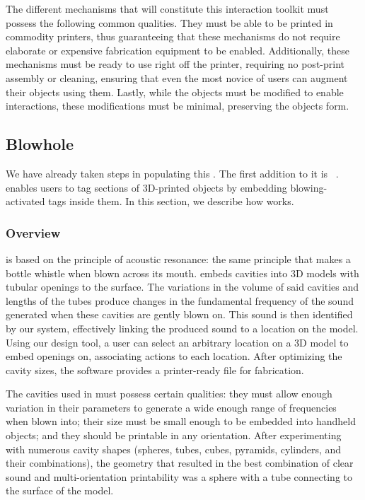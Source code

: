     The different mechanisms that will constitute this interaction toolkit must
    possess the following common qualities. They must be able to be printed in
    commodity printers, thus guaranteeing that these mechanisms do not require
    elaborate or expensive fabrication equipment to be enabled. Additionally,
    these mechanisms must be ready to use right off the printer, requiring no
    post-print assembly or cleaning, ensuring that even the most novice of
    users can augment their objects using them. Lastly, while the objects must
    be modified to enable interactions, these modifications must be minimal,
    preserving the objects form.

    \subsection{Blowhole}
      We have already taken steps in populating this \itoolkit. The first
      addition to it is \bh~\cite{Tejada:2018fj}. \bh enables users to tag
      sections of 3D-printed objects by embedding blowing-activated tags inside
      them. In this section, we describe how \bh works.

      \subsubsection{Overview}
        \bh is based on the principle of acoustic resonance: the same principle
        that makes a bottle whistle when blown across its mouth.  \bh embeds
        cavities into 3D models with tubular openings to the surface. The
        variations in the volume of said cavities and lengths of the tubes
        produce changes in the fundamental frequency of the sound generated
        when these cavities are gently blown on. This sound is then identified
        by our system, effectively linking the produced sound to a location on
        the model. Using our design tool, a user can select an arbitrary
        location on a 3D model to embed openings on, associating actions to
        each location. After optimizing the cavity sizes, the software provides
        a printer-ready file for fabrication.

        The cavities used in \bh must possess certain qualities: they must
        allow enough variation in their parameters to generate a wide enough
        range of frequencies when blown into; their size must be small enough
        to be embedded into handheld objects; and they should be printable in
        any orientation. After experimenting with numerous cavity shapes
        (spheres, tubes, cubes, pyramids, cylinders, and their combinations),
        the geometry that resulted in the best combination of clear sound and
        multi-orientation printability was a sphere with a tube connecting to
        the surface of the model.

